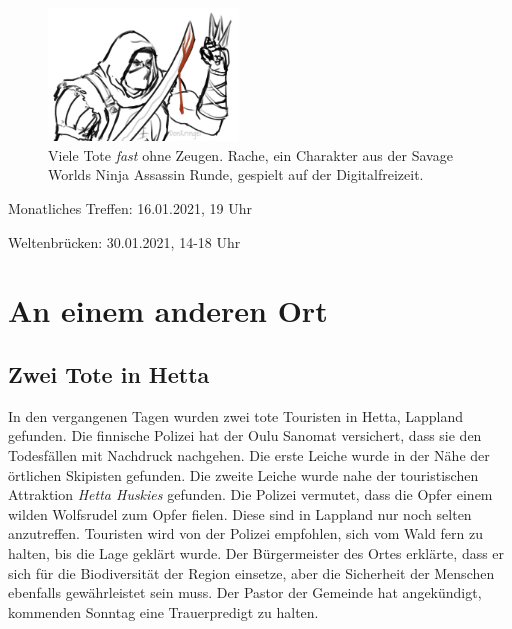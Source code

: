\documentclass[final]{multiversum}
\begin{document}
\begin{figure}[h]
  \includegraphics[width=0.45\textwidth]{src/img/ninja_assassin_rache_for_multiversum.jpg}\\
  Viele Tote \emph{fast} ohne Zeugen.
  Rache, ein Charakter aus der Savage Worlds Ninja Assassin Runde, gespielt auf der Digitalfreizeit.
\end{figure}
\vspace{-1 \baselineskip}

\begin{termine}
\item Monatliches Treffen: 16.01.2021, 19 Uhr
\item Weltenbrücken: 30.01.2021, 14-18 Uhr
\end{termine}

\section{An einem anderen Ort}

\subsection{Zwei Tote in Hetta}
In den vergangenen Tagen wurden zwei tote Touristen in Hetta, Lappland gefunden. 
Die finnische Polizei hat der Oulu Sanomat versichert, dass sie den Todesfällen mit Nachdruck nachgehen. 
Die erste Leiche wurde in der Nähe der örtlichen Skipisten gefunden. 
Die zweite Leiche wurde nahe der touristischen Attraktion \textit{Hetta Huskies} gefunden.
Die Polizei vermutet, dass die Opfer einem wilden Wolfsrudel zum Opfer fielen. 
Diese sind in Lappland nur noch selten anzutreffen. 
Touristen wird von der Polizei empfohlen, sich vom Wald fern zu halten, bis die Lage geklärt wurde. 
Der Bürgermeister des Ortes erklärte, dass er sich für die Biodiversität der Region einsetze, aber die Sicherheit der Menschen ebenfalls gewährleistet sein muss. 
Der Pastor der Gemeinde hat angekündigt, kommenden Sonntag eine Trauerpredigt zu halten.
\end{document}
